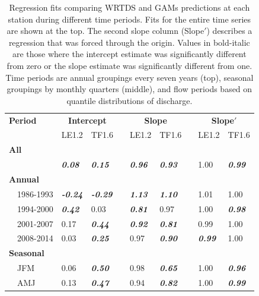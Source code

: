 \documentclass[letterpaper,12pt,oneside]{article}\usepackage[]{graphicx}\usepackage[]{color}
\begin{document}
\begin{table}[!tbp]
\caption{Regression fits comparing \ac{WRTDS} and \acp{GAM} predictions at each station during different time periods.  Fits for the entire time series are shown at the top.  The second slope column (Slope$'$) describes a regression that was forced through the origin.  Values in bold-italic are those where the intercept estimate was significantly different from zero or the slope estimate was significantly different from one.   Time periods are annual groupings every seven years (top), seasonal groupings by monthly quarters (middle), and flow periods based on quantile distributions of discharge.\label{tab:regpred}} 
\begin{center}
\begin{tabular}{lllcllcll}
\hline\hline
\multicolumn{1}{l}{\bfseries Period}&\multicolumn{2}{c}{\bfseries Intercept}&\multicolumn{1}{c}{\bfseries }&\multicolumn{2}{c}{\bfseries Slope}&\multicolumn{1}{c}{\bfseries }&\multicolumn{2}{c}{\bfseries Slope$'$}\tabularnewline
\cline{2-3} \cline{5-6} \cline{8-9}
\multicolumn{1}{l}{}&\multicolumn{1}{c}{LE1.2}&\multicolumn{1}{c}{TF1.6}&\multicolumn{1}{c}{}&\multicolumn{1}{c}{LE1.2}&\multicolumn{1}{c}{TF1.6}&\multicolumn{1}{c}{}&\multicolumn{1}{c}{LE1.2}&\multicolumn{1}{c}{TF1.6}\tabularnewline
\hline
{\bfseries All}&&&&&&&&\tabularnewline
~~&{\bf \textit{0.08}}&{\bf \textit{0.15}}&&{\bf \textit{0.96}}&{\bf \textit{0.93}}&&1.00&{\bf \textit{0.99}}\tabularnewline
\hline
{\bfseries Annual}&&&&&&&&\tabularnewline
~~1986-1993&{\bf \textit{-0.24}}&{\bf \textit{-0.29}}&&{\bf \textit{1.13}}&{\bf \textit{1.10}}&&1.01&1.00\tabularnewline
~~1994-2000&{\bf \textit{0.42}}&0.03&&{\bf \textit{0.81}}&0.97&&1.00&{\bf \textit{0.98}}\tabularnewline
~~2001-2007&0.17&{\bf \textit{0.44}}&&{\bf \textit{0.92}}&{\bf \textit{0.81}}&&0.99&1.00\tabularnewline
~~2008-2014&0.03&{\bf \textit{0.25}}&&0.97&{\bf \textit{0.90}}&&{\bf \textit{0.99}}&1.00\tabularnewline
\hline
{\bfseries Seasonal}&&&&&&&&\tabularnewline
~~JFM&0.06&{\bf \textit{0.50}}&&0.98&{\bf \textit{0.65}}&&1.00&{\bf \textit{0.96}}\tabularnewline
~~AMJ&0.13&{\bf \textit{0.47}}&&0.94&{\bf \textit{0.82}}&&1.00&{\bf \textit{0.99}}\tabularnewline

\end{tabular}
\end{center}
\end{table}
\end{document}
